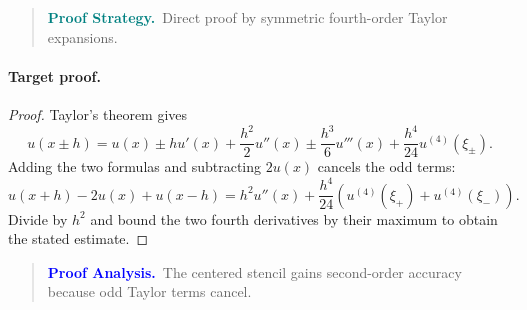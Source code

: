 \documentclass[10pt]{article}
\theoremstyle{definition}
\theoremstyle{remark}
\newenvironment{proofstrategy}
{\begin{quote}\small\noindent\textbf{\textcolor{teal}{Proof Strategy.}}\ }
{\end{quote}}
\newenvironment{proofanalysis}
{\begin{quote}\small\noindent\textbf{\textcolor{blue}{Proof Analysis.}}\ }
{\end{quote}}
\begin{document}
\begin{proofstrategy}Direct proof by symmetric fourth-order Taylor expansions.\end{proofstrategy}

\paragraph{Target proof.}

\begin{proof}

Taylor's theorem gives
\[
u(x\pm h)
=
u(x)\pm hu'(x)+\frac{h^2}{2}u''(x)
\pm\frac{h^3}{6}u'''(x)
+\frac{h^4}{24}u^{(4)}(\xi_\pm).
\]
Adding the two formulas and subtracting $2u(x)$ cancels the odd terms:
\[
u(x+h)-2u(x)+u(x-h)
=
h^2u''(x)
+\frac{h^4}{24}\left(u^{(4)}(\xi_+)+u^{(4)}(\xi_-)\right).
\]
Divide by $h^2$ and bound the two fourth derivatives by their maximum to obtain
the stated estimate.

\end{proof}

\begin{proofanalysis}The centered stencil gains second-order accuracy because odd Taylor terms cancel.\end{proofanalysis}
\end{document}
